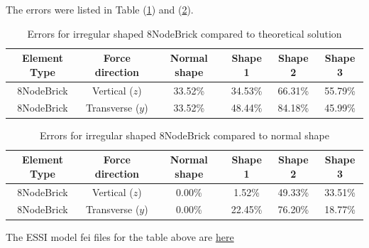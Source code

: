 \documentclass[fleqn,11pt]{article}
\begin{document}
The errors were listed in Table (\ref{table Errors for irregular shaped 8NodeBrick compared to theoretical solution}) and (\ref{talbe Errors for irregular shaped 8NodeBrick compared to normal shape}).


\begin{table}[H]
  \centering
  \caption{Errors for irregular shaped 8NodeBrick compared to theoretical solution}
  \label{table Errors for irregular shaped 8NodeBrick compared to theoretical solution}
  \begin{tabular}{|c|c|c|c|c|c|}
    \hline 
    Element Type   & Force direction & Normal shape & Shape 1 & Shape 2 & Shape 3  \\ \hline 
    8NodeBrick     & Vertical ($z$)     & 33.52\% & 34.53\% & 66.31\% & 55.79\%  \\ \hline
    8NodeBrick     & Transverse ($y$)   & 33.52\% & 48.44\% & 84.18\% & 45.99\%  \\ \hline
  \end{tabular}
\end{table}

\begin{table}[H]
  \centering
  \caption{Errors for irregular shaped 8NodeBrick compared to normal shape}
  \label{talbe Errors for irregular shaped 8NodeBrick compared to normal shape}
  \begin{tabular}{|c|c|c|c|c|c|}
    \hline 
    Element Type   & Force direction & Normal shape & Shape 1 & Shape 2 & Shape 3  \\ \hline 
    8NodeBrick     & Vertical ($z$)     & 0.00\% & 1.52\%  & 49.33\% & 33.51\%       \\ \hline
    8NodeBrick     & Transverse ($y$)   & 0.00\% & 22.45\% & 76.20\% & 18.77\%       \\ \hline
  \end{tabular}
\end{table}

The ESSI model fei files for the table above are \href{https://github.com/yuan-energy/ESSI_Verification/blob/master/8NodeBrick/cantilever_irregular_element/cantilever_irregular_element.tar.gz?raw=true}{here}



\end{document}
